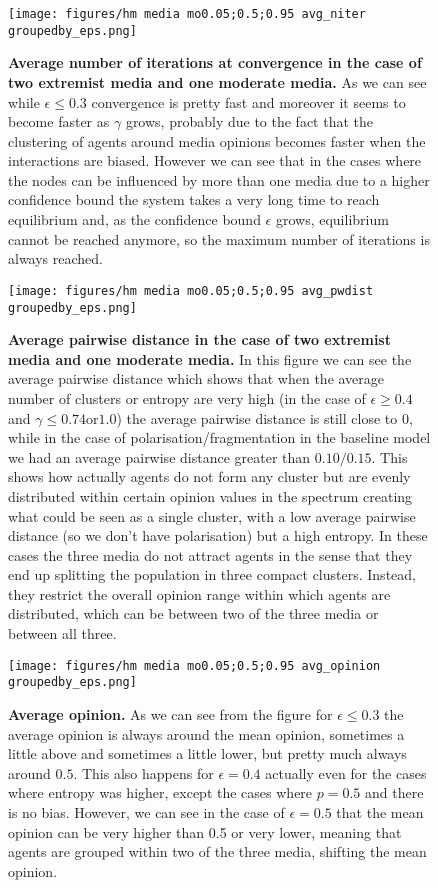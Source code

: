 \documentclass[10pt,letterpaper]{article}
\begin{document}
\begin{figure}
    \centering
    \texttt{[image: figures/hm media mo0.05;0.5;0.95 avg\_niter groupedby\_eps.png]}
    \caption{\textbf{Average number of iterations at convergence in the case of two extremist media and one moderate media.} As we can see while $\epsilon \leq 0.3$ convergence is pretty fast and moreover it seems to become faster as $\gamma$ grows, probably due to the fact that the clustering of agents around media opinions becomes faster when the interactions are biased. However we can see that in the cases where the nodes can be influenced by more than one media due to a higher confidence bound the system takes a very long time to reach equilibrium and, as the confidence bound $\epsilon$ grows, equilibrium cannot be reached anymore, so the maximum number of iterations is always reached.}
    \label{fig:3mediaavgniterbyeps}
\end{figure}

\begin{figure}
    \centering
    \texttt{[image: figures/hm media mo0.05;0.5;0.95 avg\_pwdist groupedby\_eps.png]}
    \caption{\textbf{Average pairwise distance in the case of two extremist media and one moderate media.} In this figure we can see the average pairwise distance which shows that when the average number of clusters or entropy are very high (in the case of $\epsilon \geq 0.4$ and $\gamma \leq 0.74 \text{or} 1.0$) the average pairwise distance is still close to 0, while in the case of polarisation/fragmentation in the baseline model we had an average pairwise distance greater than $0.10/0.15$. This shows how actually agents do not form any cluster but are evenly distributed within certain opinion values in the spectrum creating what could be seen as a single cluster, with a low average pairwise distance (so we don't have polarisation) but a high entropy. In these cases the three media do not attract agents in the sense that they end up splitting the population in three compact clusters. Instead, they restrict the overall opinion range within which agents are distributed, which can be between two of the three media or between all three.}
    \label{fig:3mediaavgpwdistbyeps}
\end{figure}

\begin{figure}
    \centering
    \texttt{[image: figures/hm media mo0.05;0.5;0.95 avg\_opinion groupedby\_eps.png]}
    \caption{\textbf{Average opinion.} As we can see from the figure for $\epsilon \leq 0.3$ the average opinion is always around the mean opinion, sometimes a little above and sometimes a little lower, but pretty much always around $0.5$. This also happens for $\epsilon=0.4$ actually even for the cases where entropy was higher, except the cases where $p=0.5$ and there is no bias. However, we can see in the case of $\epsilon=0.5$ that the mean opinion can be very higher than 0.5 or very lower, meaning that agents are grouped within two of the three media, shifting the mean opinion.} 
    \label{fig:3mediaavgopbyeps}
\end{figure}
\end{document}
